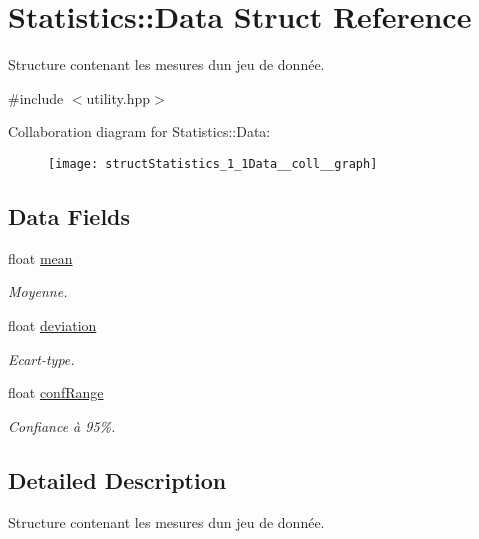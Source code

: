 \hypertarget{structStatistics_1_1Data}{}\section{Statistics\+:\+:Data Struct Reference}
\label{structStatistics_1_1Data}


Structure contenant les mesures d\textquotesingle{}un jeu de donnée.  




{\ttfamily \#include $<$utility.\+hpp$>$}



Collaboration diagram for Statistics\+:\+:Data\+:
\nopagebreak
\begin{figure}[H]
\begin{center}
\leavevmode
\texttt{[image: structStatistics\_1\_1Data\_\_coll\_\_graph]}
\end{center}
\end{figure}
\subsection*{Data Fields}
\begin{DoxyCompactItemize}
\item 
float \hyperlink{structStatistics_1_1Data_a70c674f35bce1803c894c1df2649ac3f}{mean}
\begin{DoxyCompactList}\small\item\em Moyenne. \end{DoxyCompactList}\item 
float \hyperlink{structStatistics_1_1Data_a4ab98072b8f7055a828ea80077a059f0}{deviation}
\begin{DoxyCompactList}\small\item\em Ecart-\/type. \end{DoxyCompactList}\item 
float \hyperlink{structStatistics_1_1Data_a098a51c15f9d1c2b0d50fd89fc956c06}{conf\+Range}
\begin{DoxyCompactList}\small\item\em Confiance à 95\%. \end{DoxyCompactList}\end{DoxyCompactItemize}


\subsection{Detailed Description}
Structure contenant les mesures d\textquotesingle{}un jeu de donnée. 

